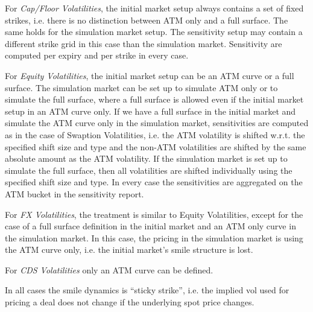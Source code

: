 \documentclass[12pt, a4paper]{article}
\begin{document}
{\begin{appendix}
\medskip
For {\em Cap/Floor Volatilities}, the initial market setup always contains a set of fixed strikes, i.e. there is no
distinction between ATM only and a full surface. The same holds for the simulation market setup. The sensitivity setup
may contain a different strike grid in this case than the simulation market. Sensitivity are computed per expiry and
per strike in every case.

\medskip
For {\em Equity Volatilities}, the initial market setup can be an ATM curve or a full surface. The simulation market can
be set up to simulate ATM only or to simulate the full surface, where a full surface is allowed even if the initial market setup in an
ATM curve only. If we have a full surface in the initial market and simulate the ATM curve only in the simulation market, sensitivities
are computed as in the case of Swaption Volatilities, i.e. the ATM volatility is shifted w.r.t. the specified shift size
and type and the non-ATM volatilities are shifted by the same absolute amount as the ATM volatility. If the simulation
market is set up to simulate the full surface, then all volatilities are shifted individually using the specified shift size and type. In
every case the sensitivities are aggregated on the ATM bucket in the sensitivity report.

\medskip
For {\em FX Volatilities}, the treatment is similar to Equity Volatilities, except for the case of a full surface
definition in the initial market and an ATM only curve in the simulation market. In this case, the pricing in the
simulation market is using the ATM curve only, i.e. the initial market's smile structure is lost.

\medskip
For {\em CDS Volatilities} only an ATM curve can be defined.

\medskip
In all cases the smile dynamics is ``sticky strike'', i.e. the implied vol used for pricing a deal does not change if
the underlying spot price changes.


\end{appendix}}
\end{document}
